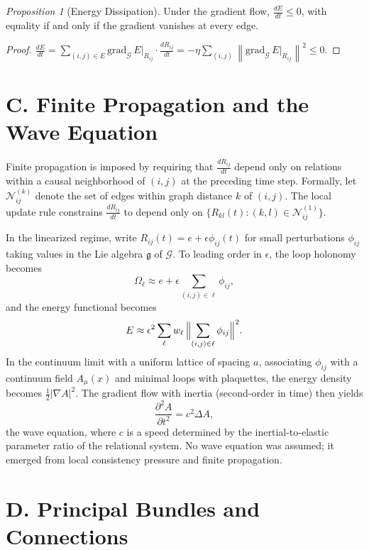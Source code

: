 \documentclass[12pt,a4paper,openany]{book}
\theoremstyle{plain}
\theoremstyle{definition}
\theoremstyle{remark}
\newtheorem*{proposition*}{Proposition}
\newcommand{\Energy}{E}
\newcommand{\norm}[1]{\left\|#1\right\|}
\begin{document}
\begin{proposition*}[Energy Dissipation]
Under the gradient flow, $\frac{d\Energy}{dt} \leq 0$, with equality if and only if the gradient vanishes at every edge.
\end{proposition*}

\begin{proof}
$\frac{d\Energy}{dt} = \sum_{(i,j) \in E} \mathrm{grad}_\mathcal{G} \, \Energy \big|_{R_{ij}} \cdot \frac{d R_{ij}}{dt} = -\eta \sum_{(i,j)} \norm{\mathrm{grad}_\mathcal{G} \, \Energy \big|_{R_{ij}}}^2 \leq 0$.
\end{proof}

\section*{C. Finite Propagation and the Wave Equation}

Finite propagation is imposed by requiring that $\frac{d R_{ij}}{dt}$ depend only on relations within a causal neighborhood of $(i, j)$ at the preceding time step. Formally, let $\mathcal{N}_{ij}^{(k)}$ denote the set of edges within graph distance $k$ of $(i, j)$. The local update rule constrains $\frac{d R_{ij}}{dt}$ to depend only on $\{R_{kl}(t) : (k, l) \in \mathcal{N}_{ij}^{(1)}\}$.

In the linearized regime, write $R_{ij}(t) = e + \epsilon \phi_{ij}(t)$ for small perturbations $\phi_{ij}$ taking values in the Lie algebra $\mathfrak{g}$ of $\mathcal{G}$. To leading order in $\epsilon$, the loop holonomy becomes
\[
\Omega_\ell \approx e + \epsilon \sum_{(i,j) \in \ell} \phi_{ij},
\]
and the energy functional becomes
\[
\Energy \approx \epsilon^2 \sum_\ell w_\ell \, \Bigl\| \sum_{(i,j) \in \ell} \phi_{ij} \Bigr\|^2.
\]
In the continuum limit with a uniform lattice of spacing $a$, associating $\phi_{ij}$ with a continuum field $A_\mu(x)$ and minimal loops with plaquettes, the energy density becomes $\frac{1}{2} \lvert \nabla A \rvert^2$. The gradient flow with inertia (second-order in time) then yields
\[
\frac{\partial^2 A}{\partial t^2} = c^2 \Delta A,
\]
the wave equation, where $c$ is a speed determined by the inertial-to-elastic parameter ratio of the relational system. No wave equation was assumed; it emerged from local consistency pressure and finite propagation.

\section*{D. Principal Bundles and Connections}
\end{document}
